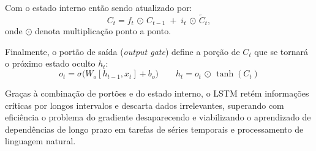 Com  o estado interno então sendo atualizado por:
\begin{equation}
   \label{input_update}
   C_t = f_t \,\odot\, C_{t-1} \;+\; i_t \,\odot\, \widetilde{C}_t,
\end{equation}
onde \(\odot\) denota multiplicação ponto a ponto.  

Finalmente, o portão de saída (\textit{output gate}) define a porção de $C_t$ que se tornará o próximo estado oculto
$h_t$:
\begin{equation}
   \label{output}
   o_t = \sigma\bigl(W_o[h_{t-1}, x_t] + b_o\bigr)
   \qquad
   h_t = o_t \,\odot\, \tanh(C_t)
\end{equation}

Graças à combinação de portões e do estado interno, o LSTM retém informações críticas por longos intervalos e descarta
dados irrelevantes, superando com eficiência o problema do gradiente desaparecendo e viabilizando o aprendizado de
dependências de longo prazo em tarefas de séries temporais e processamento de linguagem natural.